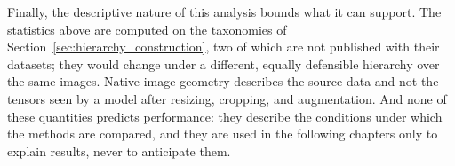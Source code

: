 Finally, the descriptive nature of this analysis bounds what it can support. The statistics above are computed on the taxonomies of Section~\ref{sec:hierarchy_construction}, two of which are not published with their datasets; they would change under a different, equally defensible hierarchy over the same images. Native image geometry describes the source data and not the tensors seen by a model after resizing, cropping, and augmentation. And none of these quantities predicts performance: they describe the conditions under which the methods are compared, and they are used in the following chapters only to explain results, never to anticipate them.
